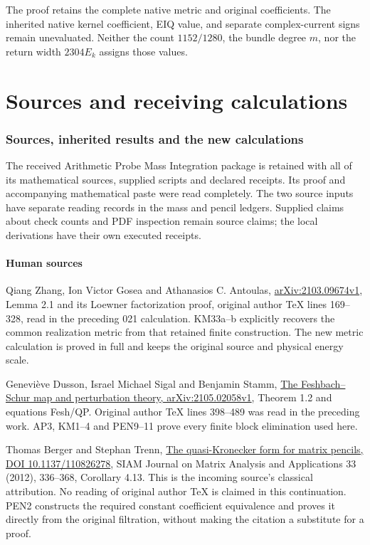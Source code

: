 \documentclass[11pt]{article}
\begin{document}
The proof retains the complete native metric and original coefficients. The inherited native kernel coefficient, EIQ value, and separate complex-current signs remain unevaluated. Neither the count \(1152/1280\), the bundle degree \(m\), nor the return width \(2304E_k\) assigns those values.

\clearpage\part{Sources and receiving calculations}
\section{Sources, inherited results and the new calculations}\label{sources-inherited-results-and-the-new-calculations}

The received Arithmetic Probe Mass Integration package is retained with all of its mathematical sources, supplied scripts and declared receipts. Its proof and accompanying mathematical paste were read completely. The two source inputs have separate reading records in the mass and pencil ledgers. Supplied claims about check counts and PDF inspection remain source claims; the local derivations have their own executed receipts.

\subsection{Human sources}\label{human-sources}

Qiang Zhang, Ion Victor Gosea and Athanasios C. Antoulas, \href{https://arxiv.org/abs/2103.09674v1}{arXiv:2103.09674v1}, Lemma 2.1 and its Loewner factorization proof, original author TeX lines 169--328, read in the preceding 021 calculation. KM33a--b explicitly recovers the common realization metric from that retained finite construction. The new metric calculation is proved in full and keeps the original source and physical energy scale.

Geneviève Dusson, Israel Michael Sigal and Benjamin Stamm, \href{https://arxiv.org/abs/2105.02058v1}{The Feshbach--Schur map and perturbation theory, arXiv:2105.02058v1}, Theorem 1.2 and equations Fesh/QP. Original author TeX lines 398--489 was read in the preceding work. AP3, KM1--4 and PEN9--11 prove every finite block elimination used here.

Thomas Berger and Stephan Trenn, \href{https://doi.org/10.1137/110826278}{The quasi-Kronecker form for matrix pencils, DOI 10.1137/110826278}, SIAM Journal on Matrix Analysis and Applications 33 (2012), 336--368, Corollary 4.13. This is the incoming source's classical attribution. No reading of original author TeX is claimed in this continuation. PEN2 constructs the required constant coefficient equivalence and proves it directly from the original filtration, without making the citation a substitute for a proof.
\end{document}
